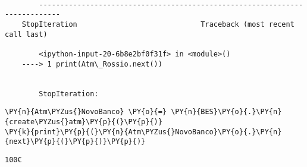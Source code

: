 \par\vspace{1\smallerfontscale}%
    \begin{addmargin}[\cellleftmargin]{0em}%
    {\smaller%
    \vspace{-1\smallerfontscale}%
    
    \begin{Verbatim}[commandchars=\\\{\}]

        ---------------------------------------------------------------------------
    StopIteration                             Traceback (most recent call last)

        <ipython-input-20-6b8e2bf0f31f> in <module>()
    ----> 1 print(Atm\_Rossio.next())
    

        StopIteration: 

    \end{Verbatim}
}%
    \end{addmargin}%

{\par%
\vspace{-1\baselineskip}%
}%
\begin{notebookcell}[21]%
\begin{addmargin}[\cellleftmargin]{0em}%
{\smaller%
\par%
%
\vspace{-1\smallerfontscale}%
\begin{Verbatim}[commandchars=\\\{\}]
\PY{n}{Atm\PYZus{}NovoBanco} \PY{o}{=} \PY{n}{BES}\PY{o}{.}\PY{n}{create\PYZus{}atm}\PY{p}{(}\PY{p}{)}
\PY{k}{print}\PY{p}{(}\PY{n}{Atm\PYZus{}NovoBanco}\PY{o}{.}\PY{n}{next}\PY{p}{(}\PY{p}{)}\PY{p}{)}
\end{Verbatim}
%
\par%
\vspace{-1\smallerfontscale}}%
\end{addmargin}
\end{notebookcell}

\par\vspace{1\smallerfontscale}%
    \begin{addmargin}[\cellleftmargin]{0em}%
    {\smaller%
    \vspace{-1\smallerfontscale}%
    
    \begin{Verbatim}[commandchars=\\\{\}]
100€
    \end{Verbatim}
}%
    \end{addmargin}%

